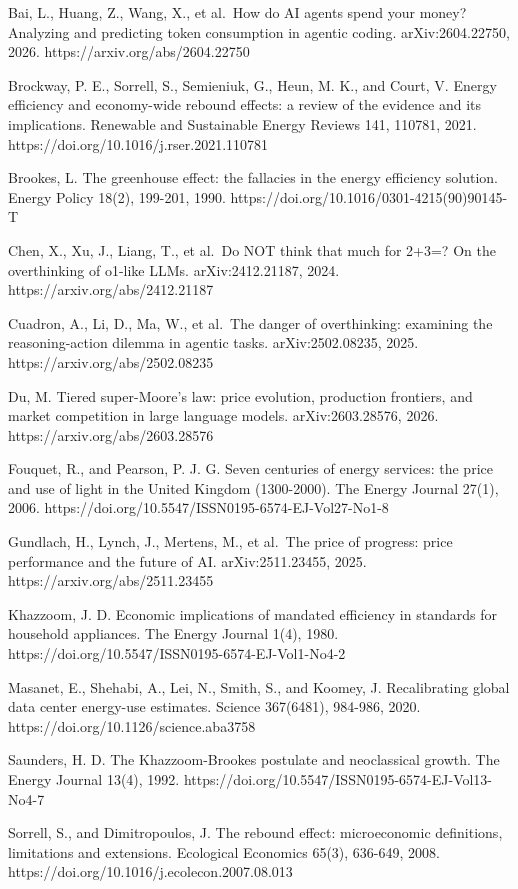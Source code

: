 \documentclass[
  10pt,
]{article}
\begin{document}
Bai, L., Huang, Z., Wang, X., et al.~How do AI agents spend your money?
Analyzing and predicting token consumption in agentic coding.
arXiv:2604.22750, 2026. https://arxiv.org/abs/2604.22750

Brockway, P. E., Sorrell, S., Semieniuk, G., Heun, M. K., and Court, V.
Energy efficiency and economy-wide rebound effects: a review of the
evidence and its implications. Renewable and Sustainable Energy Reviews
141, 110781, 2021. https://doi.org/10.1016/j.rser.2021.110781

Brookes, L. The greenhouse effect: the fallacies in the energy
efficiency solution. Energy Policy 18(2), 199-201, 1990.
https://doi.org/10.1016/0301-4215(90)90145-T

Chen, X., Xu, J., Liang, T., et al.~Do NOT think that much for 2+3=? On
the overthinking of o1-like LLMs. arXiv:2412.21187, 2024.
https://arxiv.org/abs/2412.21187

Cuadron, A., Li, D., Ma, W., et al.~The danger of overthinking:
examining the reasoning-action dilemma in agentic tasks.
arXiv:2502.08235, 2025. https://arxiv.org/abs/2502.08235

Du, M. Tiered super-Moore's law: price evolution, production frontiers,
and market competition in large language models. arXiv:2603.28576, 2026.
https://arxiv.org/abs/2603.28576

Fouquet, R., and Pearson, P. J. G. Seven centuries of energy services:
the price and use of light in the United Kingdom (1300-2000). The Energy
Journal 27(1), 2006.
https://doi.org/10.5547/ISSN0195-6574-EJ-Vol27-No1-8

Gundlach, H., Lynch, J., Mertens, M., et al.~The price of progress:
price performance and the future of AI. arXiv:2511.23455, 2025.
https://arxiv.org/abs/2511.23455

Khazzoom, J. D. Economic implications of mandated efficiency in
standards for household appliances. The Energy Journal 1(4), 1980.
https://doi.org/10.5547/ISSN0195-6574-EJ-Vol1-No4-2

Masanet, E., Shehabi, A., Lei, N., Smith, S., and Koomey, J.
Recalibrating global data center energy-use estimates. Science
367(6481), 984-986, 2020. https://doi.org/10.1126/science.aba3758

Saunders, H. D. The Khazzoom-Brookes postulate and neoclassical growth.
The Energy Journal 13(4), 1992.
https://doi.org/10.5547/ISSN0195-6574-EJ-Vol13-No4-7

Sorrell, S., and Dimitropoulos, J. The rebound effect: microeconomic
definitions, limitations and extensions. Ecological Economics 65(3),
636-649, 2008. https://doi.org/10.1016/j.ecolecon.2007.08.013
\end{document}
